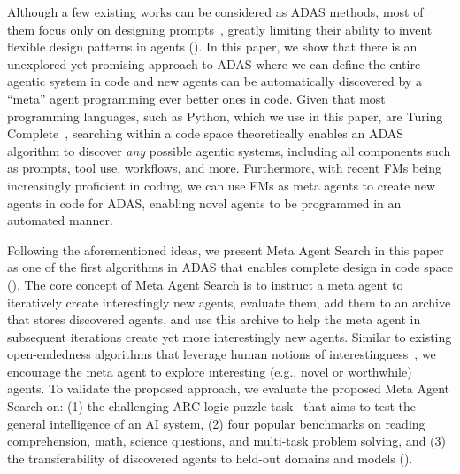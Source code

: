 \documentclass{article}
\newcommand{\problem}{ADAS\xspace}
\newcommand{\ouralgo}{Meta Agent Search\xspace}
\begin{document}
Although a few existing works can be considered as \problem methods, most of them focus only on designing prompts~\citep{yang2024OPRO,fernando2024promptbreeder}, greatly limiting their ability to invent flexible design patterns in agents ().
In this paper, we show that there is an unexplored yet promising approach to \problem where we can define the entire agentic system in code and new agents can be automatically discovered by a ``meta'' agent programming ever better ones in code.
Given that most programming languages, such as Python, which we use in this paper, are Turing Complete~\citep{boyer1983mechanical,ladha2024turing}, searching within a code space theoretically enables an \problem algorithm to discover \emph{any} possible agentic systems, including all components such as prompts, tool use, workflows, and more.
Furthermore, with recent FMs being increasingly proficient in coding, we can use FMs as meta agents to create new agents in code for \problem, enabling novel agents to be programmed in an automated manner.

Following the aforementioned ideas, we present \ouralgo in this paper as one of the first algorithms in \problem that enables complete design in code space ().
The core concept of \ouralgo is to instruct a meta agent to iteratively create interestingly new agents, evaluate them, add them to an archive that stores discovered agents, and use this archive to help the meta agent in subsequent iterations create yet more interestingly new agents.
Similar to existing open-endedness algorithms that leverage human notions of interestingness~\citep{zhang2024omni,lu2024intelligent}, we encourage the meta agent to explore interesting (e.g., novel or worthwhile) agents.
To validate the proposed approach, we evaluate the proposed \ouralgo on: (1) the challenging ARC logic puzzle task~\citep{chollet2019measure} that aims to test the general intelligence of an AI system, (2) four popular benchmarks on reading comprehension, math, science questions, and multi-task problem solving, and (3) the transferability of discovered agents to held-out domains and models  (). 
\end{document}
